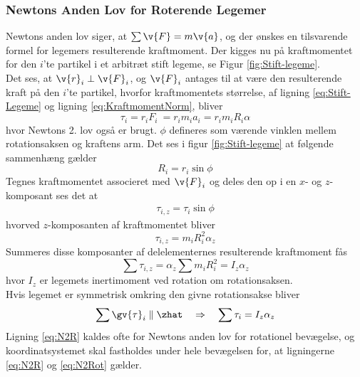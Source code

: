 \subsubsection{Newtons Anden Lov for Roterende Legemer}
Newtons anden lov siger, at $\sum\v{F}=m\v{a}$, og der ønskes en tilsvarende formel for legemers resulterende kraftmoment. Der kigges nu på kraftmomentet for den $i$'te partikel i et arbitræt stift legeme, se Figur \ref{fig:Stift-legeme}. \\
Det ses, at $\v{r}_i\perp\v{F}_i$, og $\v{F}_i$ antages til at være den resulterende kraft på den $i$'te partikel, hvorfor kraftmomentets størrelse, af ligning \eqref{eq:Stift-Legeme} og ligning \eqref{eq:KraftmomentNorm}, bliver
\begin{equation}
    \tau_i = r_iF_i\ = r_im_ia_i = r_im_iR_i\alpha
\end{equation}
hvor Newtons 2. lov også er brugt. $\phi$ defineres som værende vinklen mellem rotationsaksen og kraftens arm. Det ses i figur \ref{fig:Stift-legeme} at følgende sammenhæng gælder
\begin{equation}
    R_i=r_i\sin\phi
\end{equation}
Tegnes kraftmomentet associeret med $\v{F}_i$ og deles den op i en $x$- og $z$-komposant ses det at
\begin{align}
\tau_{i,z} = \tau_i\sin\phi
\end{align}
hvorved $z$-komposanten af kraftmomentet bliver
\begin{equation}
    \tau_{i,z}=m_iR_i^2\alpha_z
\end{equation}
Summeres disse komposanter af delelementernes resulterende kraftmoment fås
\begin{equation} \label{eq:N2R}
    \sum\tau_{i,z}=\alpha_z\sum m_iR_i^2=I_z\alpha_z
\end{equation}
hvor $I_z$ er legemets inertimoment ved rotation om rotationsaksen. \\
Hvis legemet er symmetrisk omkring den givne rotationsakse bliver
\begin{equation} \label{eq:N2Rot}
    \sum\gv{\tau}_{i}\parallel \zhat \quad\Rightarrow\quad \sum\tau_{i}=I_z\alpha_z
\end{equation}
Ligning \eqref{eq:N2R} kaldes ofte for Newtons anden lov for rotationel bevægelse, og koordinatsystemet skal fastholdes under hele bevægelsen for, at ligningerne \eqref{eq:N2R} og \eqref{eq:N2Rot} gælder.